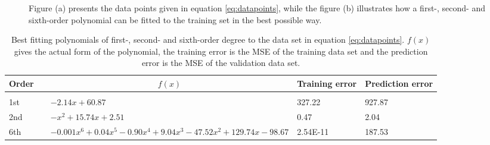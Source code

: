 \begin{figure}
	\centering
	\caption{Figure (a) presents the data points given in equation \eqref{eq:datapoints}, while the figure (b) illustrates how a first-, second- and sixth-order polynomial can be fitted to the training set in the best possible way.}%
	\label{fig:polynomials}
\end{figure}

\begin{table}
	\caption{Best fitting polynomials of first-, second- and sixth-order degree to the data set in equation \eqref{eq:datapoints}. $f(x)$ gives the actual form of the polynomial, the training error is the MSE of the training data set and the prediction error is the MSE of the validation data set.}
	\label{tab:example}
	\begin{tabularx}{\textwidth}{llR{6.5cm}R{3cm}R{3cm}} \hline\hline
		Order & \makecell{\\ \phantom{=}} &  & Training error & Prediction error \\ \hline \\
		
		1st && $-2.14x+60.87$ & 327.22 & 927.87 \\
		2nd && $-x^2+15.74x + 2.51$ & 0.47 & 2.04 \\
		6th && $-0.001x^6+0.04x^5-0.90x^4+9.04x^3-47.52x^2+129.74x-98.67$ & 2.54E-11 & 187.53 \\ \hline\hline
	\end{tabularx}
\end{table}


